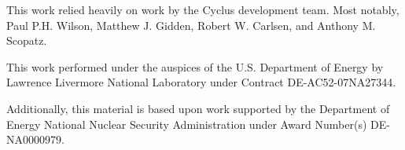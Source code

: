 This work relied heavily on work by the Cyclus development team. Most notably, 
Paul P.H. Wilson, Matthew J. Gidden, Robert W. Carlsen, and Anthony M. Scopatz. 

This work performed under the auspices of the U.S. Department of Energy by
Lawrence Livermore National Laboratory under Contract DE-AC52-07NA27344.

Additionally, this material is based upon work supported by the Department of 
Energy National Nuclear Security Administration under Award Number(s) 
DE-NA0000979. %

